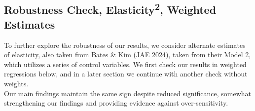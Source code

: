 \documentclass[12pt,a4paper]{article}
\begin{document}
\begin{table}[H]
	\begin{center}
		
		\label{demographic_estimates}
		\caption[Demographic Predictor Estimates, Unweighted]{Continuing as described in table \ref{main_estimates}, we find largely similar results in our unweighted regressions.}
	\end{center}
\end{table}

\begin{table}[H]
	\begin{center}
		
		\label{pop_share_estimates}
		\caption[Cheaper Gas Border Predictor Estimates, Unweighted]{Continuing as described in table \ref{main_estimates}, we find largely similar results in our unweighted regressions.}
	\end{center}
\end{table}

\subsection{Robustness Check, Elasticity\textsuperscript{2}, Weighted Estimates}
To further explore the robustness of our results, we consider alternate estimates of elasticity, also taken from Bates \& Kim (JAE 2024), taken from their Model 2, which utilizes a series of control variables. We first check our results in weighted regressions below, and in a later section we continue with another check without weights. \\

Our main findings maintain the same sign despite reduced significance, somewhat strengthening our findings and providing evidence against over-sensitivity. \\

\begin{table}[H]
	\begin{center}
		
		\label{main_estimates_y2_w}
		\caption[Alternate Main Predictor Estimates, Weighted]{Despite using different elasticity estimates, our findings maintain the same direction, and population density remains as the strongest predictor of gas price elasticity.}
	\end{center}
\end{table}
\end{document}
